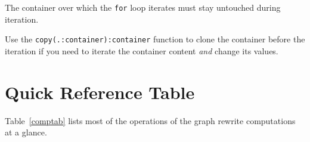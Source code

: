 \begin{warning}
The container over which the \texttt{for} loop iterates must stay untouched during iteration.

Use the \texttt{copy(.:container):container} function to clone the container before the iteration if you need to iterate the container content \emph{and} change its values.
\end{warning}


\pagebreak

\section{Quick Reference Table}

Table~\ref{comptab} lists most of the operations of the graph rewrite computations at a glance.


